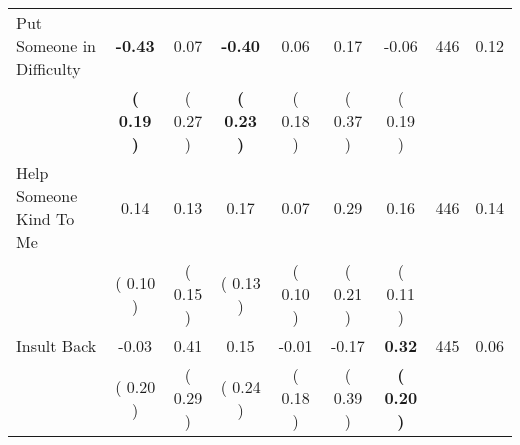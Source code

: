 \begin{tabular}{lcccccccc}
Put Someone in Difficulty & \textbf{    -0.43} &      0.07 & \textbf{    -0.40} &      0.06 &      0.17 &     -0.06 & 446 &       0.12 \\ 
 & \textbf{(     0.19 )} & (     0.27 ) & \textbf{(     0.23 )} & (     0.18 ) & (     0.37 ) & (     0.19 ) & \\
Help Someone Kind To Me &      0.14 &      0.13 &      0.17 &      0.07 &      0.29 &      0.16 & 446 &       0.14 \\ 
 & (     0.10 ) & (     0.15 ) & (     0.13 ) & (     0.10 ) & (     0.21 ) & (     0.11 ) & \\
Insult Back &     -0.03 &      0.41 &      0.15 &     -0.01 &     -0.17 & \textbf{     0.32} & 445 &       0.06 \\ 
 & (     0.20 ) & (     0.29 ) & (     0.24 ) & (     0.18 ) & (     0.39 ) & \textbf{(     0.20 )} & \\
\bottomrule
\end{tabular}
